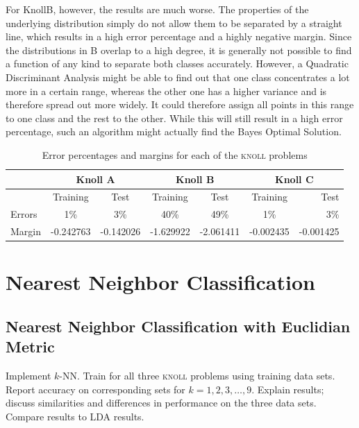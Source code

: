 \documentclass{article}
\begin{document}
For KnollB, however, the results are much worse. The properties of the underlying distribution simply
do not allow them to be separated by a straight line, which results in a high error percentage and a highly negative margin.
Since the distributions in B overlap to a high degree, it is generally not possible to find a function of any kind
to separate both classes accurately. However, a Quadratic Discriminant Analysis might be able to find out that one class
concentrates a lot more in a certain range, whereas the other one has a higher variance and is therefore spread out more widely.
It could therefore assign all points in this range to one class and the rest to the other. While this will still result in a high
error percentage, such an algorithm might actually find the Bayes Optimal Solution.

\begin{table}
\begin{tabular}{|l|c|c|c|c|c|r|}
  \hline
  & \multicolumn{2}{|c|}{Knoll A} & \multicolumn{2}{|c|}{Knoll B} & \multicolumn{2}{|c|}{Knoll C} \\
  \hline
  & Training & Test & Training & Test & Training & Test \\
  \hline
  Errors & 1\% & 3\% & 40\% & 49\% & 1\% & 3\% \\ 
  \hline
  Margin & -0.242763 & -0.142026 & -1.629922 & -2.061411 & -0.002435 & -0.001425 \\
  \hline
  \end{tabular}
  \caption{Error percentages and margins for each of the \textsc{knoll} problems}
  \label{tab:ldaknollerror}
\end{table}

\section{Nearest Neighbor Classification}

\subsection{Nearest Neighbor Classification with Euclidian Metric}

Implement $k$-NN. Train for all three \textsc{knoll} problems using
training data sets. Report accuracy on corresponding sets for $k =
1,2,3,\dots,9$. Explain results; discuss similarities and differences
in performance on the three data sets. Compare results to LDA results.
\end{document}
